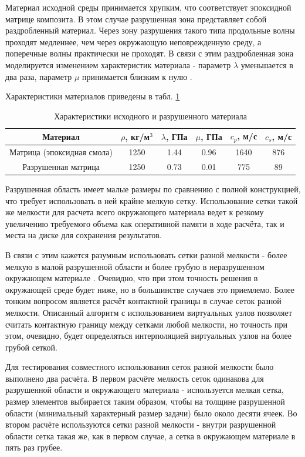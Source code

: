 Материал исходной среды принимается хрупким, что соответствует эпоксидной матрице композита. В этом случае разрушенная зона представляет собой раздробленный материал. Через зону разрушения такого типа продольные волны проходят медленнее, чем через окружающую неповрежденную среду, а поперечные волны практически не проходят. В связи с этим раздробленная зона моделируется изменением характеристик материала - параметр $\lambda$ уменьшается в два раза, параметр $\mu$ принимается близким к нулю \cite{grigoryan, vovk}. 

Характеристики материалов приведены в табл. \ref{tbl:crack}
\begin{table}[h]
\centering
\caption{Характеристики исходного и разрушенного материала}
\begin{tabular}{|c|c|c|c|c|c|}
\hline
Материал & $\rho$, кг/м$^{3}$ & $\lambda$, ГПа & $\mu$, ГПа &
$c_p$, м/с & $c_s$, м/с \\
\hline
Матрица (эпоксидная смола) & 1250 & 1.44 & 0.96 & 1640 & 876 \\
Разрушенная матрица & 1250 & 0.73 & 0.01 & 775 & 89 \\
\hline
\end{tabular}
\label{tbl:crack}
\end{table}

Разрушенная область имеет малые размеры по сравнению с полной конструкцией, что требует использовать в ней крайне мелкую сетку. Использование сетки такой же мелкости для расчета всего окружающего материала ведет к резкому увеличению требуемого объема как оперативной памяти в ходе расчёта, так и места на диске для сохранения результатов.

В связи с этим кажется разумным использовать сетки разной мелкости - более мелкую в малой разрушенной области и более грубую в неразрушенном окружающем материале \cite{a5}. Очевидно, что при этом точность решения в окружающей среде будет ниже, но в большинстве случаев это приемлемо. Более тонким вопросом является расчёт контактной границы в случае сеток разной мелкости. Описанный алгоритм с использованием виртуальных узлов позволяет считать контактную границу между сетками любой мелкости, но точность при этом, очевидно, будет определяться интерполяцией виртуальных узлов на более грубой сеткой.

Для тестирования совместного использования сеток разной мелкости было выполнено два расчёта. В первом расчёте мелкость сеток одинакова для разрушенной области и окружающего материала - используется мелкая сетка, размер элементов выбирается таким образом, чтобы на толщине разрушенной области (минимальный характерный размер задачи) было около десяти ячеек. Во втором расчёте используются сетки разной мелкости - внутри разрушенной области сетка такая же, как в первом случае, а сетка в окружающем материале в пять раз грубее.

